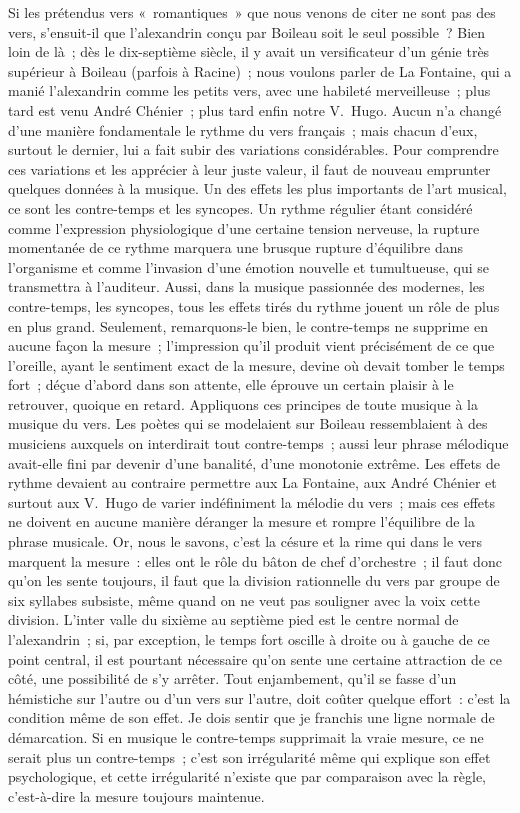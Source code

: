 \documentclass[french,twoside]{book} %
\begin{document}
Si les prétendus vers « romantiques » que nous venons de citer ne sont pas des vers, s’ensuit-il que l’alexandrin conçu par Boileau soit le seul possible ? Bien loin de là ; dès le dix-septième siècle, il y avait un versificateur d’un génie très supérieur à Boileau (parfois à Racine) ; nous voulons parler de La Fontaine, qui a manié l’alexandrin comme les petits vers, avec une habileté merveilleuse ; plus tard est venu André Chénier ; plus tard enfin notre V. Hugo. Aucun n’a changé d’une manière fondamentale le rythme du vers français ; mais chacun d’eux, surtout le dernier, lui a fait subir des variations considérables. Pour comprendre ces variations et les apprécier à leur juste valeur, il faut  de nouveau emprunter quelques données à la musique. Un des effets les plus importants de l’art musical, ce sont les contre-temps et les syncopes. Un rythme régulier étant considéré comme l’expression physiologique d’une certaine tension nerveuse, la rupture momentanée de ce rythme marquera une brusque rupture d’équilibre dans l’organisme et comme l’invasion d’une émotion nouvelle et tumultueuse, qui se transmettra à l’auditeur. Aussi, dans la musique passionnée des modernes, les contre-temps, les syncopes, tous les effets tirés du rythme jouent un rôle de plus en plus grand. Seulement, remarquons-le bien, le contre-temps ne supprime en aucune façon la mesure ; l’impression qu’il produit vient précisément de ce que l’oreille, ayant le sentiment exact de la mesure, devine où devait tomber le temps fort ; déçue d’abord dans son attente, elle éprouve un certain plaisir à le retrouver, quoique en retard. Appliquons ces principes de toute musique à la musique du vers. Les poètes qui se modelaient sur Boileau ressemblaient à des musiciens auxquels on interdirait tout contre-temps ; aussi leur phrase mélodique avait-elle fini par devenir d’une banalité, d’une monotonie extrême. Les effets de rythme devaient au contraire permettre aux La Fontaine, aux André Chénier et surtout aux V. Hugo de varier indéfiniment la mélodie du vers ; mais ces effets ne doivent en aucune manière déranger la mesure et rompre l’équilibre de la phrase musicale. Or, nous le savons, c’est la césure et la rime qui dans le vers marquent la mesure : elles ont le rôle du bâton de chef d’orchestre ; il faut donc qu’on les sente toujours, il faut que la division rationnelle  du vers par groupe de six syllabes subsiste, même quand on ne veut pas souligner avec la voix cette division. L’inter valle du sixième au septième pied est le centre normal de l’alexandrin ; si, par exception, le temps fort oscille à droite ou à gauche de ce point central, il est pourtant nécessaire qu’on sente une certaine attraction de ce côté, une possibilité de s’y arrêter. Tout enjambement, qu’il se fasse d’un hémistiche sur l’autre ou d’un vers sur l’autre, doit coûter quelque effort : c’est la condition même de son effet. Je dois sentir que je franchis une ligne normale de démarcation. Si en musique le contre-temps supprimait la vraie mesure, ce ne serait plus un contre-temps ; c’est son irrégularité même qui explique son effet psychologique, et cette irrégularité n’existe que par comparaison avec la règle, c’est-à-dire la mesure toujours maintenue.\par
\end{document}
